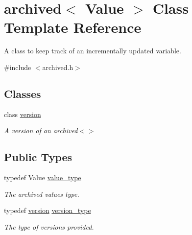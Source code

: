 \hypertarget{classarchived}{}\section{archived$<$ Value $>$ Class Template Reference}
\label{classarchived}


A class to keep track of an incrementally updated variable.  




{\ttfamily \#include $<$archived.\+h$>$}

\subsection*{Classes}
\begin{DoxyCompactItemize}
\item 
class \hyperlink{classarchived_1_1version}{version}
\begin{DoxyCompactList}\small\item\em A version of an archived$<$$>$ \end{DoxyCompactList}\end{DoxyCompactItemize}
\subsection*{Public Types}
\begin{DoxyCompactItemize}
\item 
\hypertarget{classarchived_a0f6c13c55e504fe3bbfc04f3896e5abc}{}typedef Value \hyperlink{classarchived_a0f6c13c55e504fe3bbfc04f3896e5abc}{value\+\_\+type}\label{classarchived_a0f6c13c55e504fe3bbfc04f3896e5abc}

\begin{DoxyCompactList}\small\item\em The archived value\textquotesingle{}s type. \end{DoxyCompactList}\item 
\hypertarget{classarchived_a75b8e571e7c6aca9432b9aa2ba601c00}{}typedef \hyperlink{classarchived_1_1version}{version} \hyperlink{classarchived_a75b8e571e7c6aca9432b9aa2ba601c00}{version\+\_\+type}\label{classarchived_a75b8e571e7c6aca9432b9aa2ba601c00}

\begin{DoxyCompactList}\small\item\em The type of versions provided. \end{DoxyCompactList}\end{DoxyCompactItemize}
